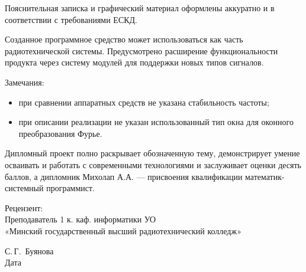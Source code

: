 {Пояснительная записка и графический материал оформлены аккуратно и в соответствии с требованиями ЕСКД.

Созданное программное средство может использоваться как часть радиотехнической системы.
Предусмотрено расширение функциональности продукта через систему модулей для поддержки новых типов сигналов.

Замечания:
\begin{itemize}
  \item{при сравнении аппаратных средств не указана стабильность частоты;}
  \item{при описании реализации не указан использованный тип окна для оконного преобразования Фурье.}
\end{itemize}

Дипломный проект полно раскрывает обозначенную тему, демонстрирует умение осваивать и работать с современными технологиями и заслуживает оценки десять баллов, а дипломник Михолап А.А. --- присвоения квалификации математик-системный программист.

  \vfill
  \noindent
  \begin{minipage}{0.4\textwidth}
    \begin{flushleft}
      Рецензент:\\
      Преподаватель 1 к. каф. информатики УО\\
      «Минский государственный высший радиотехнический колледж»
    \end{flushleft}
  \end{minipage}
  \begin{minipage}{0.58\textwidth}
    \begin{flushright}
    \underline{\hspace*{3cm}}\hspace*{0.5cm}\underline{\hspace*{2cm}} С.\,Г.~Буянова \\
    Дата\hspace*{6.5cm}
    \end{flushright}
  \end{minipage}
}

\clearpage
